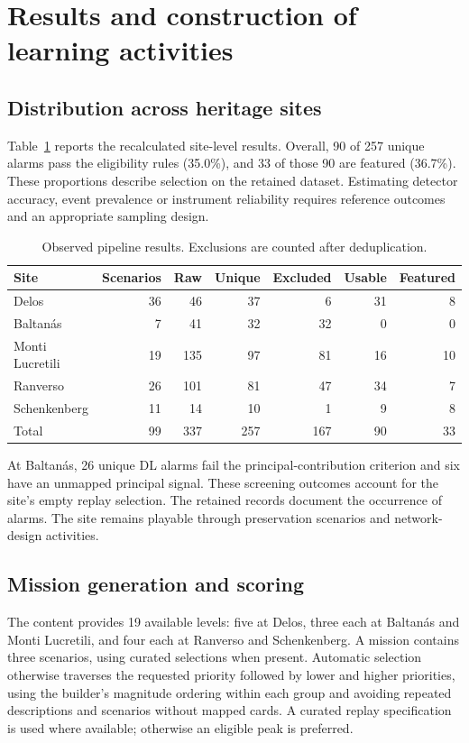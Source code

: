 \documentclass[10pt,a4paper]{article}
\begin{document}
\section{Results and construction of learning activities}
\subsection{Distribution across heritage sites}
Table~\ref{tab:results} reports the recalculated site-level results. Overall, 90 of 257 unique alarms pass the eligibility rules (35.0\%), and 33 of those 90 are featured (36.7\%). These proportions describe selection on the retained dataset. Estimating detector accuracy, event prevalence or instrument reliability requires reference outcomes and an appropriate sampling design.
\begin{table}[htbp]
\centering\small
\caption{Observed pipeline results. Exclusions are counted after deduplication.}\label{tab:results}
\begin{tabular}{@{}lrrrrrr@{}}
\toprule Site & Scenarios & Raw & Unique & Excluded & Usable & Featured\\\midrule
Delos & 36 & 46 & 37 & 6 & 31 & 8\\
Baltan\'as & 7 & 41 & 32 & 32 & 0 & 0\\
Monti Lucretili & 19 & 135 & 97 & 81 & 16 & 10\\
Ranverso & 26 & 101 & 81 & 47 & 34 & 7\\
Schenkenberg & 11 & 14 & 10 & 1 & 9 & 8\\\midrule
Total & 99 & 337 & 257 & 167 & 90 & 33\\
\bottomrule
\end{tabular}
\end{table}

At Baltan\'as, 26 unique DL alarms fail the principal-contribution criterion and six have an unmapped principal signal. These screening outcomes account for the site's empty replay selection. The retained records document the occurrence of alarms. The site remains playable through preservation scenarios and network-design activities.

\subsection{Mission generation and scoring}
The content provides 19 available levels: five at Delos, three each at Baltan\'as and Monti Lucretili, and four each at Ranverso and Schenkenberg. A mission contains three scenarios, using curated selections when present. Automatic selection otherwise traverses the requested priority followed by lower and higher priorities, using the builder's magnitude ordering within each group and avoiding repeated descriptions and scenarios without mapped cards. A curated replay specification is used where available; otherwise an eligible peak is preferred.
\end{document}
